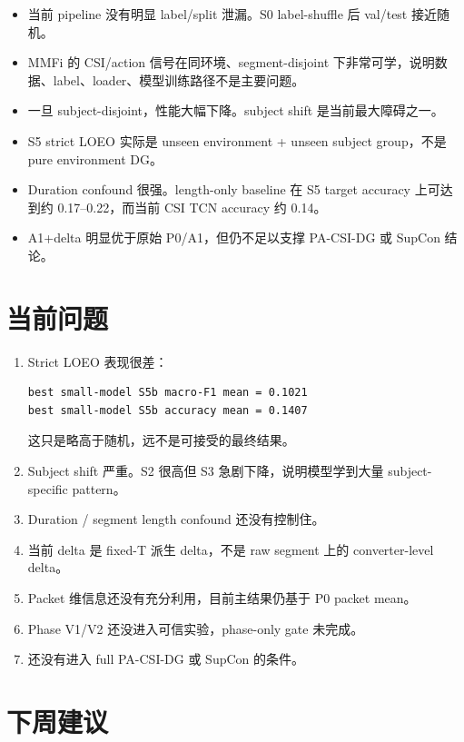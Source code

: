 \documentclass[UTF8,11pt]{ctexart}
\begin{document}
\begin{itemize}
  \item 当前 pipeline 没有明显 label/split 泄漏。S0 label-shuffle 后 val/test 接近随机。
  \item MMFi 的 CSI/action 信号在同环境、segment-disjoint 下非常可学，说明数据、label、loader、模型训练路径不是主要问题。
  \item 一旦 subject-disjoint，性能大幅下降。subject shift 是当前最大障碍之一。
  \item S5 strict LOEO 实际是 unseen environment + unseen subject group，不是 pure environment DG。
  \item Duration confound 很强。length-only baseline 在 S5 target accuracy 上可达到约 0.17--0.22，而当前 CSI TCN accuracy 约 0.14。
  \item A1+delta 明显优于原始 P0/A1，但仍不足以支撑 PA-CSI-DG 或 SupCon 结论。
\end{itemize}

\section{当前问题}

\begin{enumerate}
  \item Strict LOEO 表现很差：
\begin{verbatim}
best small-model S5b macro-F1 mean = 0.1021
best small-model S5b accuracy mean = 0.1407
\end{verbatim}
  这只是略高于随机，远不是可接受的最终结果。

  \item Subject shift 严重。S2 很高但 S3 急剧下降，说明模型学到大量 subject-specific pattern。

  \item Duration / segment length confound 还没有控制住。

  \item 当前 delta 是 fixed-T 派生 delta，不是 raw segment 上的 converter-level delta。

  \item Packet 维信息还没有充分利用，目前主结果仍基于 P0 packet mean。

  \item Phase V1/V2 还没进入可信实验，phase-only gate 未完成。

  \item 还没有进入 full PA-CSI-DG 或 SupCon 的条件。
\end{enumerate}

\section{下周建议}
\end{document}
